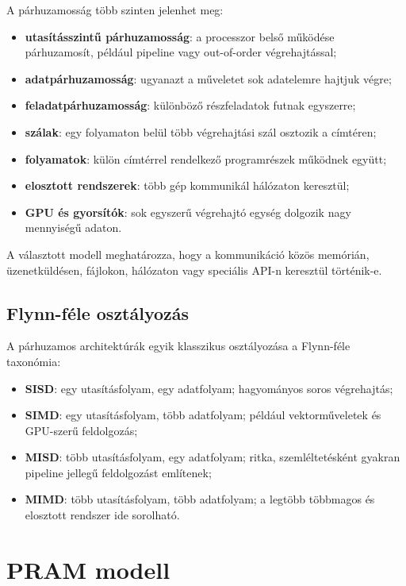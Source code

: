 A párhuzamosság több szinten jelenhet meg:

\begin{itemize}
  \item \textbf{utasításszintű párhuzamosság}: a processzor belső működése párhuzamosít, például pipeline vagy out-of-order végrehajtással;
  \item \textbf{adatpárhuzamosság}: ugyanazt a műveletet sok adatelemre hajtjuk végre;
  \item \textbf{feladatpárhuzamosság}: különböző részfeladatok futnak egyszerre;
  \item \textbf{szálak}: egy folyamaton belül több végrehajtási szál osztozik a címtéren;
  \item \textbf{folyamatok}: külön címtérrel rendelkező programrészek működnek együtt;
  \item \textbf{elosztott rendszerek}: több gép kommunikál hálózaton keresztül;
  \item \textbf{GPU és gyorsítók}: sok egyszerű végrehajtó egység dolgozik nagy mennyiségű adaton.
\end{itemize}

A választott modell meghatározza, hogy a kommunikáció közös memórián, üzenetküldésen, fájlokon, hálózaton vagy speciális API-n keresztül történik-e.

\subsection{Flynn-féle osztályozás}

A párhuzamos architektúrák egyik klasszikus osztályozása a Flynn-féle taxonómia:

\begin{itemize}
  \item \textbf{SISD}: egy utasításfolyam, egy adatfolyam; hagyományos soros végrehajtás;
  \item \textbf{SIMD}: egy utasításfolyam, több adatfolyam; például vektorműveletek és GPU-szerű feldolgozás;
  \item \textbf{MISD}: több utasításfolyam, egy adatfolyam; ritka, szemléltetésként gyakran pipeline jellegű feldolgozást említenek;
  \item \textbf{MIMD}: több utasításfolyam, több adatfolyam; a legtöbb többmagos és elosztott rendszer ide sorolható.
\end{itemize}

\section{PRAM modell}

